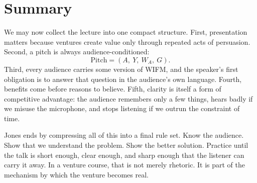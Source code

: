 \section{Summary}

We may now collect the lecture into one compact structure. First, presentation matters because ventures create value only through repeated acts of persuasion. Second, a pitch is always audience-conditioned:
\[
\text{Pitch}=(A,\ Y,\ W_A,\ G).
\]
Third, every audience carries some version of WIFM, and the speaker's first obligation is to answer that question in the audience's own language. Fourth, benefits come before reasons to believe. Fifth, clarity is itself a form of competitive advantage: the audience remembers only a few things, hears badly if we misuse the microphone, and stops listening if we outrun the constraint of time.

Jones ends by compressing all of this into a final rule set. Know the audience. Show that we understand the problem. Show the better solution. Practice until the talk is short enough, clear enough, and sharp enough that the listener can carry it away. In a venture course, that is not merely rhetoric. It is part of the mechanism by which the venture becomes real.